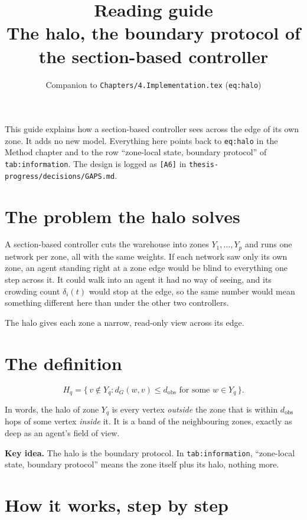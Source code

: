 \documentclass[11pt,a4paper]{article}
\title{Reading guide\\[2pt]\large The halo, the boundary protocol of the section-based controller}
\author{Companion to \texttt{Chapters/4.Implementation.tex} (\texttt{eq:halo})}
\date{}
\newcommand{\idea}[1]{\par\smallskip\noindent\colorbox{boxbg}{\parbox{\dimexpr\linewidth-2\fboxsep}{\textbf{Key idea.} #1}}\par\smallskip}
\begin{document}
\maketitle

\noindent This guide explains how a section-based controller sees across
the edge of its own zone. It adds no new model. Everything here points back
to \texttt{eq:halo} in the Method chapter and to the row ``zone-local state,
boundary protocol'' of \texttt{tab:information}. The design is logged as
\texttt{[A6]} in \texttt{thesis-progress/decisions/GAPS.md}.

\tableofcontents

\section{The problem the halo solves}

A section-based controller cuts the warehouse into zones $Y_1,\dots,Y_p$
and runs one network per zone, all with the same weights. If each network
saw only its own zone, an agent standing right at a zone edge would be
blind to everything one step across it. It could walk into an agent it had
no way of seeing, and its crowding count $\delta_i(t)$ would stop at the
edge, so the same number would mean something different here than under
the other two controllers.

The halo gives each zone a narrow, read-only view across its edge.

\section{The definition}

\[
  H_q = \{\, v \notin Y_q : d_G(w,v) \le d_{\mathrm{obs}} \text{ for some } w \in Y_q \,\}.
\]

\noindent In words, the halo of zone $Y_q$ is every vertex \emph{outside}
the zone that is within $d_{\mathrm{obs}}$ hops of some vertex
\emph{inside} it. It is a band of the neighbouring zones, exactly as deep as
an agent's field of view.

\idea{The halo is the boundary protocol. In \texttt{tab:information},
``zone-local state, boundary protocol'' means the zone itself plus its halo,
nothing more.}

\section{How it works, step by step}
\end{document}
